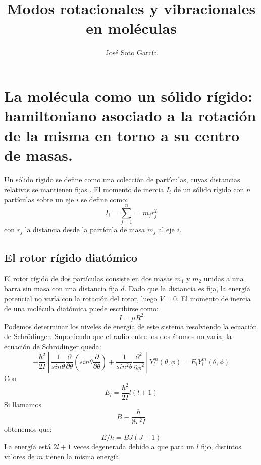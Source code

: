 \documentclass[a4paper]{article}
\title{Modos rotacionales y vibracionales en moléculas}
\author{José Soto García}
\begin{document}
\maketitle
\section{La molécula como un sólido rígido: hamiltoniano asociado a la rotación de la misma en torno a su centro de masas.}
Un sólido rígido se define como una colección de partículas, cuyas distancias relativas se mantienen fijas \cite{marion2013}. El momento de inercia $I_i$ de un sólido rígido con $n$ partículas sobre un eje $i$ se define como:
\begin{equation}
I_i= \sum_{j=1}^n=m_jr_j^2
\end{equation}
con $r_j$ la distancia desde la partícula de masa $m_j$ al eje $i$.

\subsection{El rotor rígido diatómico}
El rotor rígido de dos partículas consiste en dos masas $m_1$ y $m_2$ unidas a una barra sin masa con una distancia fija $d$. Dado que la distancia es fija, la energía potencial no varía con la rotación del rotor, luego $V=0$. \cite{levine1980} El momento de inercia de una molécula diatómica puede escribirse como:
\begin{equation}
I=\mu R^2
\end{equation}
Podemos determinar los niveles de energía de este sistema resolviendo la ecuación de Schrödinger. Suponiendo que el radio entre los dos átomos no varía, la ecuación de Schrödinger queda:
\begin{equation}
- \frac{\hbar^2}{2I}\left[\frac{1}{sin\theta}\frac{\partial}{\partial \theta}\left(sin\theta \frac{\partial}{\partial \theta} \right) + \frac{1}{sin^2\theta}\frac{\partial^2}{\partial \phi^2}\right]Y^m_l \left(\theta,\phi \right) = E_lY^m_l \left(\theta,\phi \right)
\end{equation}
Con
$$E_l= \frac{\hbar^2}{2I}l(l+1)$$
Si llamamos $$B\equiv \frac{h}{8\pi^2I}$$
obtenemos que:
\begin{equation}
E/h=BJ(J+1)
\end{equation}
La energía está $2l+1$ veces degenerada debido a que para un $l$ fijo, distintos valores de $m$ tienen la misma energía.
\end{document}
